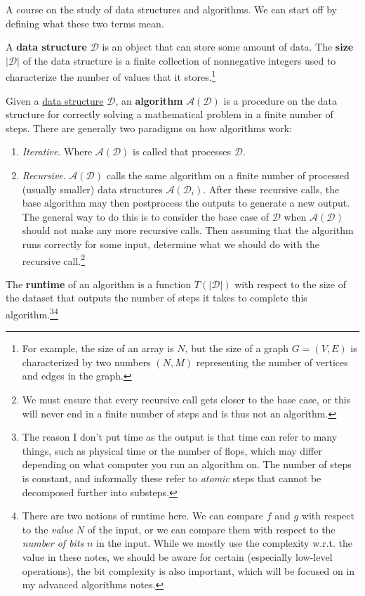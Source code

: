 A course on the study of data structures and algorithms. We can start off by defining what these two terms mean. 

\begin{definition}
  \label{def:data-structure}
  A \textbf{data structure} $\mathcal{D}$ is an object that can store some amount of data. The \textbf{size} $|\mathcal{D}|$ of the data structure is a finite collection of nonnegative integers used to characterize the number of values that it stores.\footnote{For example, the size of an array is $N$, but the size of a graph $G = (V, E)$ is characterized by two numbers $(N, M)$ representing the number of vertices and edges in the graph.} 
\end{definition}

\begin{definition}[Algorithm]
  \label{def:algorithm}
  Given a \hyperref[def:data-structure]{data structure} $\mathcal{D}$, an \textbf{algorithm} $\mathcal{A}(\mathcal{D})$ is a procedure on the data structure for correctly solving a mathematical problem in a finite number of steps. There are generally two paradigms on how algorithms work: 
  \begin{enumerate}
    \item \textit{Iterative}. Where $\mathcal{A}(\mathcal{D})$ is called that processes $\mathcal{D}$. 
    \item \textit{Recursive}. $\mathcal{A}(\mathcal{D})$ calls the same algorithm on a finite number of processed (usually smaller) data structures $\mathcal{A}(\mathcal{D}_i)$. After these recursive calls, the base algorithm may then postprocess the outputs to generate a new output. The general way to do this is to consider the base case of $\mathcal{D}$ when $\mathcal{A}(\mathcal{D})$ should not make any more recursive calls. Then assuming that the algorithm runs correctly for some input, determine what we should do with the recursive call.\footnote{We must ensure that every recursive call gets closer to the base case, or this will never end in a finite number of steps and is thus not an algorithm. }
  \end{enumerate}
  The \textbf{runtime} of an algorithm is a function $T(|\mathcal{D}|)$ with respect to the size of the dataset that outputs the number of steps it takes to complete this algorithm.\footnote{The reason I don't put time as the output is that time can refer to many things, such as physical time or the number of flops, which may differ depending on what computer you run an algorithm on. The number of steps is constant, and informally these refer to \textit{atomic} steps that cannot be decomposed further into substeps.}\footnote{There are two notions of runtime here. We can compare $f$ and $g$ with respect to the \textit{value} $N$ of the input, or we can compare them with respect to the \textit{number of bits} $n$ in the input. While we mostly use the complexity w.r.t. the value in these notes, we should be aware for certain (especially low-level operations), the bit complexity is also important, which will be focused on in my advanced algorithms notes. }
\end{definition}


